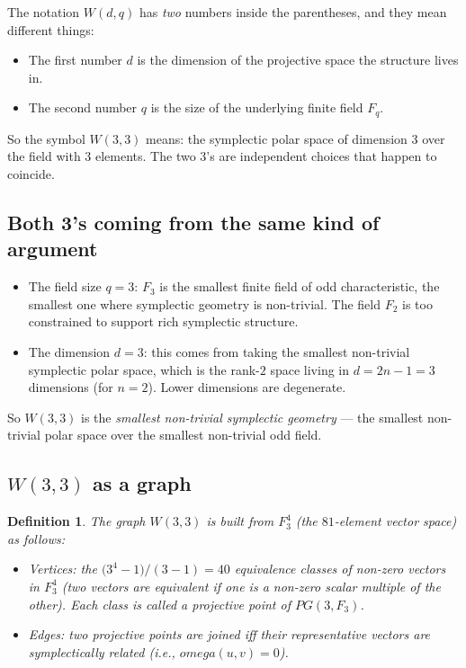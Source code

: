 \documentclass[11pt]{article}
\def\mathbb#1{#1}%
\def\mathrm#1{#1}%
\def\textbf#1{#1}%
\def\omega{omega}%
\newtheorem*{definition}{Definition}
\newcommand{\W}{W(3,3)}
\begin{document}
The notation $W(d, q)$ has \emph{two} numbers inside the parentheses, and they mean different things:
\begin{itemize}[leftmargin=2em]
\item The \textbf{first} number $d$ is the dimension of the projective space the structure lives in.
\item The \textbf{second} number $q$ is the size of the underlying finite field $\mathbb{F}_q$.
\end{itemize}

So the symbol $W(3,3)$ means: the symplectic polar space of dimension $3$ over the field with $3$ elements. The two $3$'s are independent choices that happen to coincide.

\subsection*{Both 3's coming from the same kind of argument}

\begin{itemize}[leftmargin=2em]
\item The \textbf{field size} $q = 3$: $\mathbb{F}_3$ is the smallest finite field of odd characteristic, the smallest one where symplectic geometry is non-trivial. The field $\mathbb{F}_2$ is too constrained to support rich symplectic structure.
\item The \textbf{dimension} $d = 3$: this comes from taking the smallest non-trivial symplectic polar space, which is the rank-$2$ space living in $d = 2n - 1 = 3$ dimensions (for $n = 2$). Lower dimensions are degenerate.
\end{itemize}

So $W(3,3)$ is the \emph{smallest non-trivial symplectic geometry} --- the smallest non-trivial polar space over the smallest non-trivial odd field.

\subsection*{$W(3,3)$ as a graph}

\begin{definition}
The graph $\W$ is built from $\mathbb{F}_3^4$ (the $81$-element vector space) as follows:
\begin{itemize}[leftmargin=2em]
\item \textbf{Vertices:} the $\bigl(3^4 - 1\bigr)/(3-1) = 40$ equivalence classes of non-zero vectors in $\mathbb{F}_3^4$ (two vectors are equivalent if one is a non-zero scalar multiple of the other). Each class is called a \textbf{projective point} of $\mathrm{PG}(3, \mathbb{F}_3)$.
\item \textbf{Edges:} two projective points are joined iff their representative vectors are symplectically related (i.e., $\omega(u, v) = 0$).
\end{itemize}
\end{definition}
\end{document}
